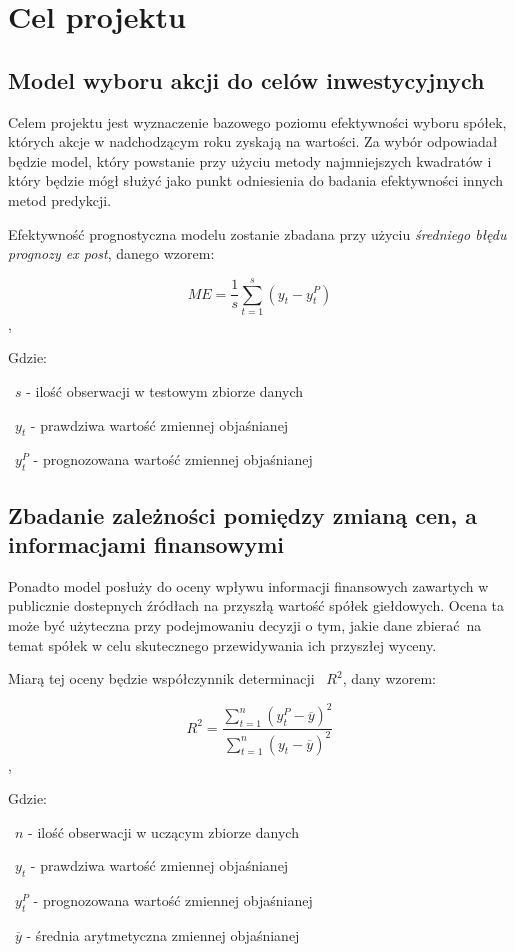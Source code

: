\documentclass{article}
\begin{document}
\newpage
\section{Cel projektu}

\subsection{Model wyboru akcji do celów inwestycyjnych}
Celem projektu jest wyznaczenie bazowego poziomu efektywności wyboru spółek, których akcje w nadchodzącym roku zyskają na wartości. Za wybór odpowiadał będzie model, który powstanie przy użyciu metody najmniejszych kwadratów i który będzie mógł służyć jako punkt odniesienia do badania efektywności innych metod predykcji.

Efektywność prognostyczna modelu zostanie zbadana przy użyciu \textit{średniego błędu prognozy ex post}, danego wzorem:

\[ ME = \frac{1}{s} \sum_{t=1}^{s} ( y_t - y_t^P ) \],

Gdzie:

~$s$ - ilość obserwacji w testowym zbiorze danych

~$y_t$ - prawdziwa wartość zmiennej objaśnianej

~$y_t^P$ - prognozowana wartość zmiennej objaśnianej

\medskip

\subsection{Zbadanie zależności pomiędzy zmianą cen, a informacjami finansowymi}
Ponadto model posłuży do oceny wpływu informacji finansowych zawartych w publicznie dostepnych źródłach na przyszłą wartość spółek giełdowych. Ocena ta może być użyteczna przy podejmowaniu decyzji o tym, jakie dane zbierać na temat spółek w celu skutecznego przewidywania ich przyszłej wyceny.

Miarą tej oceny będzie współczynnik determinacji ~$R^2$, dany wzorem:

\[ R^2 = \frac{\sum_{t=1}^{n}(y_t^P-\overline{y})^2}{\sum_{t=1}^{n}(y_t-\overline{y})^2} \],

Gdzie:

~$n$ - ilość obserwacji w uczącym zbiorze danych

~$y_t$ - prawdziwa wartość zmiennej objaśnianej

~$y_t^P$ - prognozowana wartość zmiennej objaśnianej

~$\overline{y}$ - średnia arytmetyczna zmiennej objaśnianej
\end{document}
